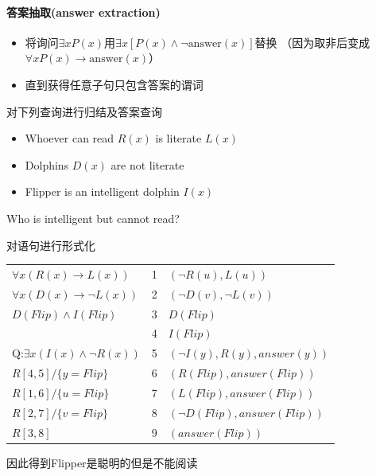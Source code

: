 \paragraph{答案抽取(answer extraction)}
\begin{itemize}
\item 将询问$\exists xP(x)$用$\exists x[P(x)\land\lnot\text{answer}(x)]$替换
（因为取非后变成$\forall x P(x)\to\text{answer}(x)$）
\item 直到获得任意子句只包含答案的谓词
\end{itemize}
\begin{example}
对下列查询进行归结及答案查询
\begin{itemize}
	\item Whoever can read $R(x)$ is literate $L(x)$
	\item Dolphins $D(x)$ are not literate
	\item Flipper is an intelligent dolphin $I(x)$
\end{itemize}
Who is intelligent but cannot read?
\end{example}
\begin{analysis}
对语句进行形式化
\begin{center}
\begin{tabular}{lll}
$\forall x (R(x)\to L(x))$ & 1 & $(\lnot R(u),L(u))$\\
$\forall x (D(x)\to \lnot L(x))$ & 2 & $(\lnot D(v),\lnot L(v))$\\
$D(Flip)\land I(Flip)$ & 3 & $D(Flip)$\\
 & 4 & $I(Flip)$\\
Q:$\exists x (I(x)\land\lnot R(x))$ & 5 & $(\lnot I(y),R(y),answer(y))$\\\hline 
$R[4,5]/\{y=Flip\}$ & 6 & $(R(Flip),answer(Flip))$\\
$R[1,6]/\{u=Flip\}$ & 7 & $(L(Flip),answer(Flip))$\\
$R[2,7]/\{v=Flip\}$ & 8 & $(\lnot D(Flip),answer(Flip))$\\
$R[3,8]$ & 9 & $(answer(Flip))$
\end{tabular}
\end{center}
因此得到Flipper是聪明的但是不能阅读
\end{analysis}